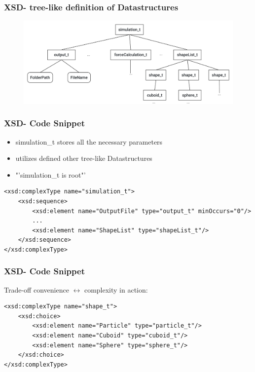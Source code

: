 
\begin{frame}
	\frametitle{XSD- tree-like definition of Datastructures}
	\begin{figure}
		\centering
		\includegraphics[width=\linewidth]{xsdScetch}
		\label{fig:xsdscetchtbc}
	\end{figure}
	
	
\end{frame}

\begin{frame}[fragile]
	\frametitle{XSD- Code Snippet}
	\large
	\begin{itemize}
		\item simulation\_t stores all the necessary parameters
		\item utilizes defined other tree-like Datastructures
		\item "'simulation\_t is root"'
	\end{itemize}
	
	\vspace{0.3cm}
	
	\begin{lstlisting}
<xsd:complexType name="simulation_t">
	<xsd:sequence>
		<xsd:element name="OutputFile" type="output_t" minOccurs="0"/>
		...
		<xsd:element name="ShapeList" type="shapeList_t"/>
	</xsd:sequence>
</xsd:complexType>
	\end{lstlisting}
\end{frame}

\begin{frame}[fragile]
	\frametitle{XSD- Code Snippet}
	\Large
	\vspace{1cm}
	Trade-off convenience $\leftrightarrow$ complexity in action:
	\large
	\vspace{0.5cm}
	\begin{lstlisting}
<xsd:complexType name="shape_t">
	<xsd:choice>
		<xsd:element name="Particle" type="particle_t"/>
		<xsd:element name="Cuboid" type="cuboid_t"/>
		<xsd:element name="Sphere" type="sphere_t"/>
	</xsd:choice>
</xsd:complexType>
	\end{lstlisting}
	
\end{frame}


